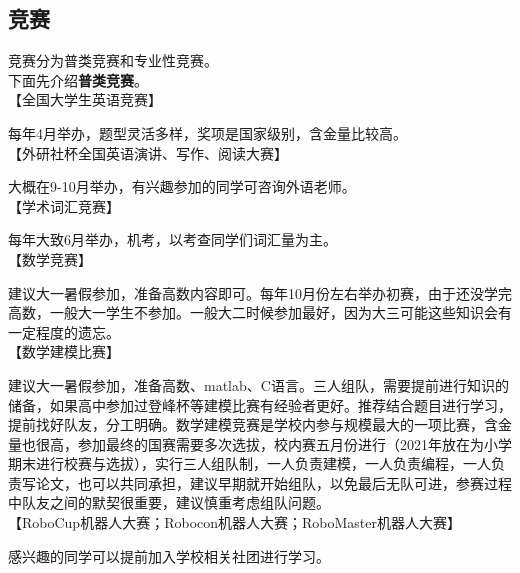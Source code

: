 \documentclass[
decoration,  %
]{qyxf-book}
\begin{document}
\subsection{竞赛}
\noindent 竞赛分为普类竞赛和专业性竞赛。\\
下面先介绍\textbf{普类竞赛}。\\
【全国大学生英语竞赛】\par
每年4月举办，题型灵活多样，奖项是国家级别，含金量比较高。\\
【外研社杯全国英语演讲、写作、阅读大赛】\par
大概在9-10月举办，有兴趣参加的同学可咨询外语老师。\\
【学术词汇竞赛】\par
每年大致6月举办，机考，以考查同学们词汇量为主。\\
【数学竞赛】\par
建议大一暑假参加，准备高数内容即可。每年10月份左右举办初赛，由于还没学完高数，一般大一学生不参加。一般大二时候参加最好，因为大三可能这些知识会有一定程度的遗忘。\\
【数学建模比赛】\par
建议大一暑假参加，准备高数、matlab、C语言。三人组队，需要提前进行知识的储备，如果高中参加过登峰杯等建模比赛有经验者更好。推荐结合题目进行学习，提前找好队友，分工明确。数学建模竞赛是学校内参与规模最大的一项比赛，含金量也很高，参加最终的国赛需要多次选拔，校内赛五月份进行（2021年放在为小学期末进行校赛与选拔），实行三人组队制，一人负责建模，一人负责编程，一人负责写论文，也可以共同承担，建议早期就开始组队，以免最后无队可进，参赛过程中队友之间的默契很重要，建议慎重考虑组队问题。\\
【RoboCup机器人大赛；Robocon机器人大赛；RoboMaster机器人大赛】\par
感兴趣的同学可以提前加入学校相关社团进行学习。\\
\end{document}
